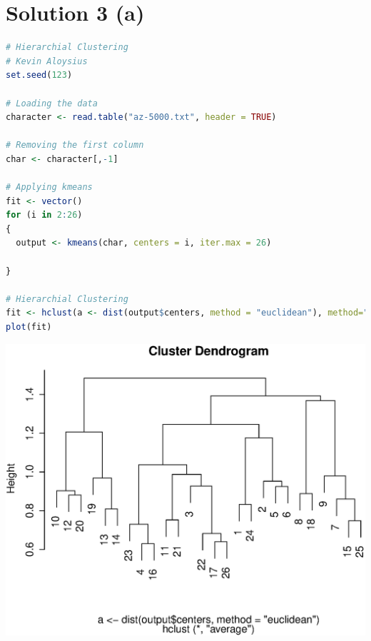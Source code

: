 \documentclass[a4paper,20pt]{article}
\begin{document}
\section*{Solution 3 (a)}
\begin{lstlisting}[language = R]
# Hierarchial Clustering
# Kevin Aloysius
set.seed(123)

# Loading the data
character <- read.table("az-5000.txt", header = TRUE)

# Removing the first column
char <- character[,-1]

# Applying kmeans
fit <- vector()
for (i in 2:26)
{
  output <- kmeans(char, centers = i, iter.max = 26)
  
}

# Hierarchial Clustering
fit <- hclust(a <- dist(output$centers, method = "euclidean"), method="average")
plot(fit)
\end{lstlisting}
\begin{center}
\includegraphics[scale=0.7]{dendogram.eps}
\end{center}
\newpage
\end{document}
